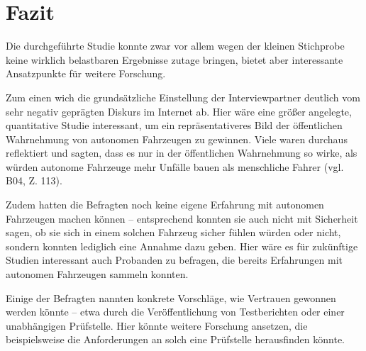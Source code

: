 \section{Fazit}

Die durchgeführte Studie konnte zwar vor allem wegen der kleinen Stichprobe keine wirklich belastbaren Ergebnisse zutage bringen, bietet aber interessante Ansatzpunkte für weitere Forschung.

Zum einen wich die grundsätzliche Einstellung der Interviewpartner deutlich vom sehr negativ geprägten Diskurs im Internet ab. Hier wäre eine größer angelegte, quantitative Studie interessant, um ein repräsentativeres Bild der öffentlichen Wahrnehmung von autonomen Fahrzeugen zu gewinnen. Viele waren durchaus reflektiert und sagten, dass es nur in der öffentlichen Wahrnehmung so wirke, als würden autonome Fahrzeuge mehr Unfälle bauen als menschliche Fahrer (vgl. B04, Z. 113). 

Zudem hatten die Befragten noch keine eigene Erfahrung mit autonomen Fahrzeugen machen können -- entsprechend konnten sie auch nicht mit Sicherheit sagen, ob sie sich in einem solchen Fahrzeug sicher fühlen würden oder nicht, sondern konnten lediglich eine Annahme dazu geben. Hier wäre es für zukünftige Studien interessant auch Probanden zu befragen, die bereits Erfahrungen mit autonomen Fahrzeugen sammeln konnten.

Einige der Befragten nannten konkrete Vorschläge, wie Vertrauen gewonnen werden könnte -- etwa durch die Veröffentlichung von Testberichten oder einer unabhängigen Prüfstelle. Hier könnte weitere Forschung ansetzen, die beispielsweise die Anforderungen an solch eine Prüfstelle herausfinden könnte.